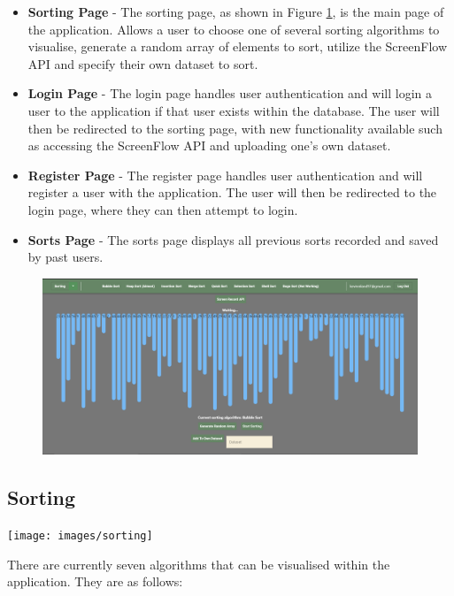 \begin{itemize}
    \item \textbf{Sorting Page} - The sorting page, as shown in Figure \ref{fig:main_page}, is the main page of the application. Allows a user to choose one of several sorting algorithms to visualise, generate a random array of elements to sort, utilize the ScreenFlow API and specify their own dataset to sort.
    \item \textbf{Login Page} - The login page handles user authentication and will login a user to the application if that user exists within the database. The user will then be redirected to the sorting page, with new functionality available such as accessing the ScreenFlow API and uploading one's own dataset.
    \item \textbf{Register Page} - The register page handles user authentication and will register a user with the application. The user will then be redirected to the login page, where they can then attempt to login.
    \item \textbf{Sorts Page} - The sorts page displays all previous sorts recorded and saved by past users.
\end{itemize}

\begin{figure}[!h]
    \centering
    \includegraphics[scale=.35]{images/web_app_main}
    \label{fig:main_page}
\end{figure}

\subsection{Sorting}
\begin{center}
    \texttt{[image: images/sorting]}
    \label{fig:main_page}
\end{center}

There are currently seven algorithms that can be visualised within the application. They are as follows:

